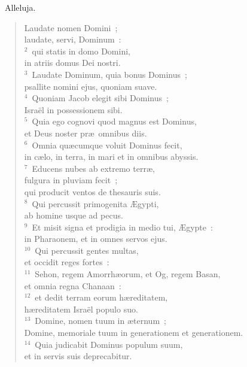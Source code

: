 ~\lettrine[lines=10,image=true,loversize=0.05,lraise=-0.03]{A}{}lleluja. \begin{flushleft}\begin{verse}\vspace{6pt}Laudate nomen Domini~;\\ laudate, servi, Dominum~:\\
${}^{2}$~qui statis in domo Domini,\\ in atriis domus Dei nostri.\\
${}^{3}$~Laudate Dominum, quia bonus Dominus~;\\ psallite nomini ejus, quoniam suave.\\
${}^{4}$~Quoniam Jacob elegit sibi Dominus~;\\ Isra\"el in possessionem sibi.\\
${}^{5}$~Quia ego cognovi quod magnus est Dominus,\\ et Deus noster pr\ae\ omnibus diis.\\
${}^{6}$~Omnia qu\ae cumque voluit Dominus fecit,\\ in c\ae lo, in terra, in mari et in omnibus abyssis.\\
${}^{7}$~Educens nubes ab extremo terr\ae ,\\ fulgura in pluviam fecit~;\\ qui producit ventos de thesauris suis.\\
${}^{8}$~Qui percussit primogenita \AE gypti,\\ ab homine usque ad pecus.\\
${}^{9}$~Et misit signa et prodigia in medio tui, \AE gypte~:\\ in Pharaonem, et in omnes servos ejus.\\
${}^{10}$~Qui percussit gentes multas,\\ et occidit reges fortes~:\\
${}^{11}$~Sehon, regem Amorrh\ae orum, et Og, regem Basan,\\ et omnia regna Chanaan~:\\
${}^{12}$~et dedit terram eorum h\ae reditatem,\\ h\ae reditatem Isra\"el populo suo.\\
${}^{13}$~Domine, nomen tuum in \ae ternum~;\\ Domine, memoriale tuum in generationem et generationem.\\
${}^{14}$~Quia judicabit Dominus populum suum,\\ et in servis suis deprecabitur.\\

\end{verse}
\end{flushleft}
